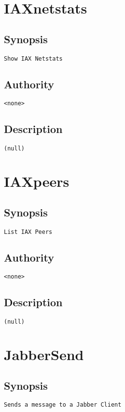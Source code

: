 \section{IAXnetstats}
\subsection{Synopsis}
\begin{verbatim}
Show IAX Netstats
\end{verbatim}
\subsection{Authority}
\begin{verbatim}
<none>
\end{verbatim}
\subsection{Description}
\begin{verbatim}
(null)
\end{verbatim}


\section{IAXpeers}
\subsection{Synopsis}
\begin{verbatim}
List IAX Peers
\end{verbatim}
\subsection{Authority}
\begin{verbatim}
<none>
\end{verbatim}
\subsection{Description}
\begin{verbatim}
(null)
\end{verbatim}


\section{JabberSend}
\subsection{Synopsis}
\begin{verbatim}
Sends a message to a Jabber Client
\end{verbatim}
